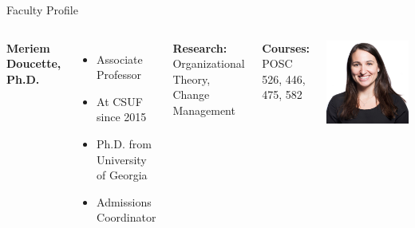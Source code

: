 \documentclass[10pt]{beamer}
\newlength{\imageheight}
\begin{document}
        \begin{frame}{Faculty Profile}
        \begin{columns}[t]
        \textbf{Meriem Doucette, Ph.D.}
        \begin{itemize}
        \item Associate Professor
        \item At CSUF since 2015
        \item Ph.D. from University of Georgia
        \item Admissions Coordinator
        \end{itemize}
        
        \textbf{Research:} Organizational Theory, Change Management
        
        \textbf{Courses:} POSC 526, 446, 475, 582
        
        \vspace*{0.5cm}
        \includegraphics[height=\imageheight]{images/doucette.png}
        \end{columns}
        \end{frame}
        
\end{document}
